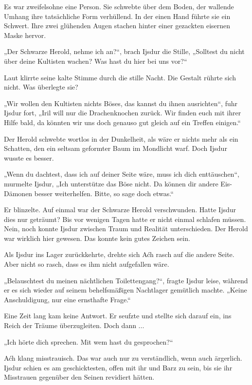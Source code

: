 Es war zweifelsohne eine Person. Sie schwebte über dem Boden, der wallende Umhang ihre tatsächliche Form verhüllend. In der einen Hand führte sie ein Schwert. Ihre zwei glühenden Augen stachen hinter einer gezackten eisernen Maske hervor.

„Der Schwarze Herold, nehme ich an?“, brach Ijsdur die Stille, „Solltest du nicht über deine Kultisten wachen? Was hast du hier bei uns vor?“

Laut klirrte seine kalte Stimme durch die stille Nacht. Die Gestalt rührte sich nicht. Was überlegte sie?

„Wir wollen den Kultisten nichts Böses, das kannst du ihnen ausrichten“, fuhr Ijsdur fort, „Iril will nur die Drachenknochen zurück. Wir finden euch mit ihrer Hilfe bald, da könnten wir uns doch genauso gut gleich auf ein Treffen einigen.“

Der Herold schwebte wortlos in der Dunkelheit, als wäre er nichts mehr als ein Schatten, den ein seltsam geformter Baum im Mondlicht warf. Doch Ijsdur wusste es besser.

„Wenn du dachtest, dass ich auf deiner Seite wäre, muss ich dich enttäuschen“, murmelte Ijsdur, „Ich unterstütze das Böse nicht. Da können dir andere Eis-Dämonen besser weiterhelfen. Bitte, so sage doch etwas.“

Er blinzelte. Auf einmal war der Schwarze Herold verschwunden. Hatte Ijsdur dies nur geträumt? Bis vor wenigen Tagen hatte er nicht einmal schlafen müssen. Nein, noch konnte Ijsdur zwischen Traum und Realität unterschieden. Der Herold war wirklich hier gewesen. Das konnte kein gutes Zeichen sein.\bigskip







Als Ijsdur ins Lager zurückkehrte, drehte sich Aćh rasch auf die andere Seite. Aber nicht so rasch, dass es ihm nicht aufgefallen wäre.

„Belauschtest du meinen nächtlichen Toilettengang?“, fragte Ijsdur leise, während er es sich wieder auf seinem behelfsmäßigen Nachtlager gemütlich machte. „Keine Anschuldigung, nur eine ernsthafte Frage.“

Eine Zeit lang kam keine Antwort. Er seufzte und stellte sich darauf ein, ins Reich der Träume überzugleiten. Doch dann ...

„Ich hörte dich sprechen. Mit wem hast du gesprochen?“

Aćh klang misstrauisch. Das war auch nur zu verständlich, wenn auch ärgerlich. Ijsdur schien es am geschicktesten, offen mit ihr und Barz zu sein, bis sie ihr Misstrauen gegenüber den Seinen revidiert hätten.

